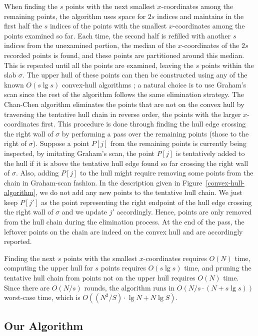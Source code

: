 \documentclass[final,onetabnum,onefignum,onethmnum]{siamltex}
\begin{document}
When finding the $s$ points with the next smallest $x$-coordinates
among the remaining points, the algorithm uses space for $2s$
indices and maintains in the first half the $s$ indices of the points with the
smallest $x$-coordinates among the points examined so far. Each time,
the second half is refilled with another $s$ indices from the
unexamined portion, the median of the $x$-coordinates of the $2s$
recorded points is found, and these points are partitioned around this
median. This is repeated until all the points are examined, leaving
the $s$ points within the slab $\sigma$. The upper hull of these
points can then be constructed using any
of the known $O(s \lg s)$ convex-hull algorithms \cite[Chapter~3]{PS85}; a natural choice is to use Graham's scan since the rest of
the algorithm follows the same elimination strategy. The Chan-Chen
algorithm eliminates the points that are not on the convex hull by traversing
the tentative hull chain in reverse order, the points with the larger 
$x$-coordinates first. This procedure is done through finding the hull
edge crossing the right wall of $\sigma$ by performing a pass over the
remaining points (those to the right of $\sigma$). Suppose a point
$P[j]$ from the remaining points is currently being inspected, by
imitating Graham's scan, the point $P[j]$ is tentatively added to the
hull if it is above the tentative hull edge found so far crossing the
right wall of $\sigma$. Also, adding $P[j]$ to the hull might require
removing some points from the chain in Graham-scan fashion. In the description
given in Figure~\ref{convex-hull-algorithm}, we do not add any new points
to the tentative hull chain. We just keep $P[j']$ as the point representing 
the right endpoint of the hull edge crossing the right wall of $\sigma$ and we 
update $j'$ accordingly. Hence, points are only removed from the hull chain 
during the elimination process. At the end of the pass, the leftover points on the chain 
are indeed on the convex hull and are accordingly reported.

Finding the next $s$ points with the smallest $x$-coordinates
requires $O(N)$ time, computing the upper hull for $s$ points requires $O(s
\lg s)$ time, and pruning the tentative hull chain from points not on the
upper hull requires $O(N)$ time. Since there are $O(N/s)$ rounds, the
algorithm runs in $O(N/s \cdot (N + s \lg s))$ worst-case time,
which is $O((N^2/S) \cdot \lg N + N \lg S)$.

\subsection{Our Algorithm}
\end{document}
